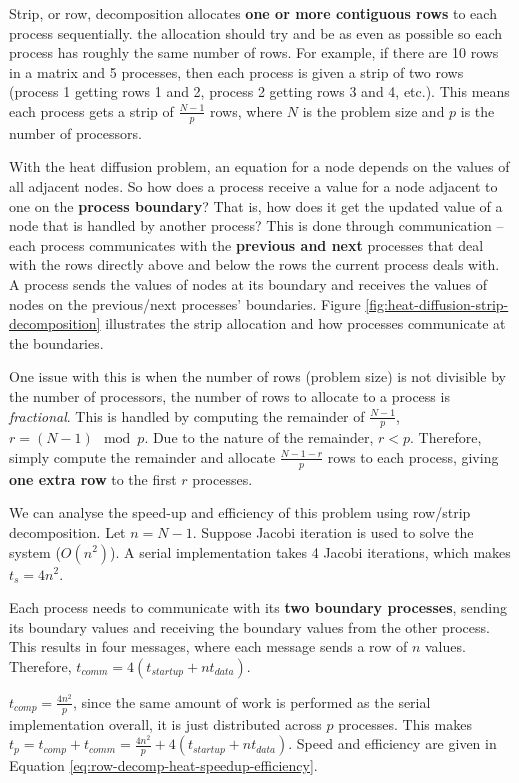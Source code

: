 \documentclass{article}
\begin{document}
Strip, or row, decomposition allocates \textbf{one or more contiguous rows} to each process sequentially. the allocation should try and be as even as possible so each process has roughly the same number of rows. For example, if there are 10 rows in a matrix and 5 processes, then each process is given a strip of two rows (process 1 getting rows 1 and 2, process 2 getting rows 3 and 4, etc.). This means each process gets a strip of $\frac{N - 1}{p}$ rows, where $N$ is the problem size and $p$ is the number of processors.

With the heat diffusion problem, an equation for a node depends on the values of all adjacent nodes. So how does a process receive a value for a node adjacent to one on the \textbf{process boundary}? That is, how does it get the updated value of a node that is handled by another process? This is done through communication -- each process communicates with the \textbf{previous and next} processes that deal with the rows directly above and below the rows the current process deals with. A process sends the values of nodes at its boundary and receives the values of nodes on the previous/next processes' boundaries. Figure \ref{fig:heat-diffusion-strip-decomposition} illustrates the strip allocation and how processes communicate at the boundaries.

One issue with this is when the number of rows (problem size) is not divisible by the number of processors, the number of rows to allocate to a process is \textit{fractional}. This is handled by computing the remainder of $\frac{N - 1}{p}$, $r = (N - 1) \mod p$. Due to the nature of the remainder, $r < p$. Therefore, simply compute the remainder and allocate $\frac{N - 1 - r}{p}$ rows to each process, giving \textbf{one extra row} to the first $r$ processes.

We can analyse the speed-up and efficiency of this problem using row/strip decomposition. Let $n = N -1$. Suppose Jacobi iteration is used to solve the system ($O(n^2)$). A serial implementation takes 4 Jacobi iterations, which makes $t_s = 4n^2$.

Each process needs to communicate with its \textbf{two boundary processes}, sending its boundary values and receiving the boundary values from the other process. This results in four messages, where each message sends a row of $n$ values. Therefore, $t_{comm} = 4(t_{startup} + nt_{data})$.

$t_{comp} = \frac{4n^2}{p}$, since the same amount of work is performed as the serial implementation overall, it is just distributed across $p$ processes. This makes $t_p = t_{comp}  + t_{comm} = \frac{4n^2}{p} + 4(t_{startup} + nt_{data})$. Speed and efficiency are given in Equation \ref{eq:row-decomp-heat-speedup-efficiency}.
\end{document}
